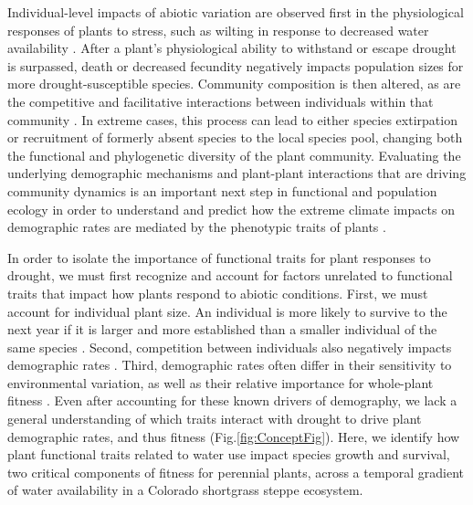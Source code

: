 \documentclass[12pt, letterpaper]{article}
\begin{document}
Individual-level impacts of abiotic variation are observed first in the physiological responses of plants to stress, such as wilting in response to decreased water availability \citep{Bartlett2012}. After a plant's physiological ability to withstand or escape drought is surpassed, death or decreased fecundity negatively impacts population sizes for more drought-susceptible species. Community composition is then altered, as are the competitive and facilitative interactions between individuals within that community \citep{Ploughe2019CommunityInteractions}. In extreme cases, this process can lead to either species extirpation or recruitment of formerly absent species to the local species pool, changing both the functional and phylogenetic diversity of the plant community.  Evaluating the underlying demographic mechanisms and plant-plant interactions that are driving community dynamics is an important next step in functional and population ecology in order to understand and predict how the extreme climate impacts on demographic rates are mediated by the phenotypic traits of plants \citep{Laughlin2020TheFitness,Ploughe2019CommunityInteractions,Hoover2014ResistanceExtremes,Salguero-Gomez2012}.   

In order to isolate the importance of functional traits for plant responses to drought, we must first recognize and account for factors unrelated to functional traits that impact how plants respond to abiotic conditions. First, we must account for individual plant size. An individual is more likely to survive to the next year if it is larger and more established than a smaller individual of the same species \citep{Tredennick2017}. Second, competition between individuals also negatively impacts demographic rates \citep{Adler2012}. Third, demographic rates often differ in their sensitivity to environmental variation, as well as their relative importance for whole-plant fitness \citep{Laughlin2020TheFitness,Dibner2019}. Even after accounting for these known drivers of demography, we lack a general understanding of which traits interact with drought to drive plant demographic rates, and thus fitness \citep{Laughlin2018,Laughlin2020TheFitness}(Fig.\ref{fig:ConceptFig}). Here, we identify how plant functional traits related to water use impact species growth and survival, two critical components of fitness for perennial plants, across a temporal gradient of water availability in a Colorado shortgrass steppe ecosystem. 
\end{document}
